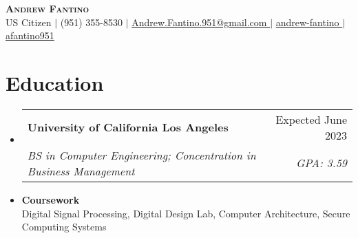 \documentclass[letterpaper,11pt]{article}
\makeatletter
\newcommand{\resumeSubheading}[4]{
  \vspace{-2pt}\item
    \begin{tabular*}{0.97\textwidth}[t]{l@{\extracolsep{\fill}}r}
      \textbf{#1} & #2 \\
      \textit{\small#3} & \textit{\small #4} \\
    \end{tabular*}\vspace{-7pt}
}
\newcommand{\resumeSubHeadingListStart}{\begin{itemize}[leftmargin=0.15in, label={}]}
\newcommand{\resumeSubHeadingListEnd}{\end{itemize}}
\makeatother
\begin{document}
\begin{center}
  \textbf{\Huge \scshape Andrew Fantino} \\ \vspace{5pt}
  \small US Citizen $|$
  \small {} (951) 355-8530 $|$ 
  \href{mailto:andrew.fantino.951@gmail.com}{  Andrew.Fantino.951@gmail.com } $|$ 
  \href{https://linkedin.com/in/andrew-fantino/}{  andrew-fantino } $|$
  \href{https://github.com/afantino951}{  afantino951} 
\end{center}
\vspace*{-1.5em}

\section{Education}
  \resumeSubHeadingListStart
    \resumeSubheading
      {University of California Los Angeles}{Expected June 2023}
      {BS in Computer Engineering; Concentration in Business Management}{GPA: 3.59}
      \vspace{-2pt}\item
      \textbf{Coursework} \\
        

        \small\quad Digital Signal Processing, Digital Design Lab, Computer Architecture, Secure Computing Systems
      \vspace{-7pt}

  \resumeSubHeadingListEnd

\end{document}
